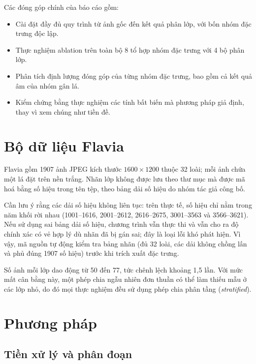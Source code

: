\documentclass[11pt,a4paper]{article}
\begin{document}
Các đóng góp chính của báo cáo gồm:
\begin{itemize}
  \item Cài đặt đầy đủ quy trình từ ảnh gốc đến kết quả phân lớp, với bốn nhóm đặc trưng độc lập.
  \item Thực nghiệm ablation trên toàn bộ 8 tổ hợp nhóm đặc trưng với 4 bộ phân lớp.
  \item Phân tích định lượng đóng góp của từng nhóm đặc trưng, bao gồm cả kết quả âm của nhóm gân lá.
  \item Kiểm chứng bằng thực nghiệm các tính bất biến mà phương pháp giả định, thay vì xem chúng như
        tiền đề.
\end{itemize}

\section{Bộ dữ liệu Flavia}

Flavia gồm 1907 ảnh JPEG kích thước $1600\times1200$ thuộc 32 loài; mỗi ảnh chứa một lá đặt trên nền
trắng. Nhãn lớp không được lưu theo thư mục mà được mã hoá bằng số hiệu trong tên tệp, theo bảng
dải số hiệu do nhóm tác giả công bố.

Cần lưu ý rằng các dải số hiệu không liên tục: trên thực tế, số hiệu chỉ nằm trong năm khối rời nhau
(1001--1616, 2001--2612, 2616--2675, 3001--3563 và 3566--3621). Nếu sử dụng sai bảng dải số hiệu,
chương trình vẫn thực thi và vẫn cho ra độ chính xác có vẻ hợp lý dù nhãn đã bị gán sai; đây là loại
lỗi khó phát hiện. Vì vậy, mã nguồn tự động kiểm tra bảng nhãn (đủ 32 loài, các dải không chồng lấn
và phủ đúng 1907 số hiệu) trước khi trích xuất đặc trưng.

Số ảnh mỗi lớp dao động từ 50 đến 77, tức chênh lệch khoảng 1,5 lần. Với mức mất cân bằng này, một
phép chia ngẫu nhiên đơn thuần có thể làm thiếu mẫu ở các lớp nhỏ, do đó mọi thực nghiệm đều sử dụng
phép chia phân tầng (\emph{stratified}).

\section{Phương pháp}

\subsection{Tiền xử lý và phân đoạn}
\end{document}
